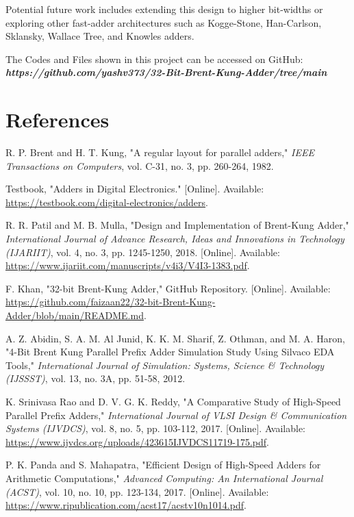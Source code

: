 \documentclass{IEEEtran}
\begin{document}
Potential future work includes extending this design to higher bit-widths or exploring other fast-adder architectures such as Kogge-Stone, Han-Carlson, Sklansky, Wallace Tree, and Knowles adders.

The Codes and Files shown in this project can be accessed on GitHub: \textbf{\textit{https://github.com/yashv373/32-Bit-Brent-Kung-Adder/tree/main}}


\section{References}
\begin{thebibliography}{10}

 R. P. Brent and H. T. Kung, "A regular layout for parallel adders," \textit{IEEE Transactions on Computers}, vol. C-31, no. 3, pp. 260-264, 1982.

 Testbook, "Adders in Digital Electronics." [Online]. Available: \url{https://testbook.com/digital-electronics/adders}.

 R. R. Patil and M. B. Mulla, "Design and Implementation of Brent-Kung Adder," \textit{International Journal of Advance Research, Ideas and Innovations in Technology (IJARIIT)}, vol. 4, no. 3, pp. 1245-1250, 2018. [Online]. Available: \url{https://www.ijariit.com/manuscripts/v4i3/V4I3-1383.pdf}.

 F. Khan, "32-bit Brent-Kung Adder," GitHub Repository. [Online]. Available: \url{https://github.com/faizaan22/32-bit-Brent-Kung-Adder/blob/main/README.md}.

 A. Z. Abidin, S. A. M. Al Junid, K. K. M. Sharif, Z. Othman, and M. A. Haron, "4-Bit Brent Kung Parallel Prefix Adder Simulation Study Using Silvaco EDA Tools," \textit{International Journal of Simulation: Systems, Science \& Technology (IJSSST)}, vol. 13, no. 3A, pp. 51-58, 2012.

 K. Srinivasa Rao and D. V. G. K. Reddy, "A Comparative Study of High-Speed Parallel Prefix Adders," \textit{International Journal of VLSI Design \& Communication Systems (IJVDCS)}, vol. 8, no. 5, pp. 103-112, 2017. [Online]. Available: \url{https://www.ijvdcs.org/uploads/423615IJVDCS11719-175.pdf}.

 P. K. Panda and S. Mahapatra, "Efficient Design of High-Speed Adders for Arithmetic Computations," \textit{Advanced Computing: An International Journal (ACST)}, vol. 10, no. 10, pp. 123-134, 2017. [Online]. Available: \url{https://www.ripublication.com/acst17/acstv10n1014.pdf}.


\end{thebibliography}
\end{document}
